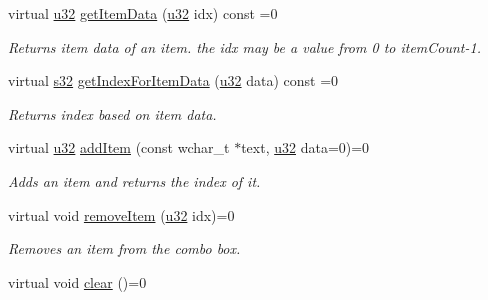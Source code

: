 \begin{DoxyCompactItemize}
virtual \hyperlink{namespaceirr_a0416a53257075833e7002efd0a18e804}{u32} \hyperlink{classirr_1_1gui_1_1IGUIComboBox_ac0f2189cf87e4ffe38834edea01c75fb}{get\+Item\+Data} (\hyperlink{namespaceirr_a0416a53257075833e7002efd0a18e804}{u32} idx) const =0
\begin{DoxyCompactList}\small\item\em Returns item data of an item. the idx may be a value from 0 to item\+Count-\/1. \end{DoxyCompactList}\item 
\mbox{\label{classirr_1_1gui_1_1IGUIComboBox_a01c1dea5455f7a9302cea8d156787c3e}} 
virtual \hyperlink{namespaceirr_ac66849b7a6ed16e30ebede579f9b47c6}{s32} \hyperlink{classirr_1_1gui_1_1IGUIComboBox_a01c1dea5455f7a9302cea8d156787c3e}{get\+Index\+For\+Item\+Data} (\hyperlink{namespaceirr_a0416a53257075833e7002efd0a18e804}{u32} data) const =0
\begin{DoxyCompactList}\small\item\em Returns index based on item data. \end{DoxyCompactList}\item 
\mbox{\label{classirr_1_1gui_1_1IGUIComboBox_a1952afb705f497306cb006c502ac181c}} 
virtual \hyperlink{namespaceirr_a0416a53257075833e7002efd0a18e804}{u32} \hyperlink{classirr_1_1gui_1_1IGUIComboBox_a1952afb705f497306cb006c502ac181c}{add\+Item} (const wchar\+\_\+t $\ast$text, \hyperlink{namespaceirr_a0416a53257075833e7002efd0a18e804}{u32} data=0)=0
\begin{DoxyCompactList}\small\item\em Adds an item and returns the index of it. \end{DoxyCompactList}\item 
virtual void \hyperlink{classirr_1_1gui_1_1IGUIComboBox_aa6a351f80aa57374459a9d66f416ce3c}{remove\+Item} (\hyperlink{namespaceirr_a0416a53257075833e7002efd0a18e804}{u32} idx)=0
\begin{DoxyCompactList}\small\item\em Removes an item from the combo box. \end{DoxyCompactList}\item 
\mbox{\label{classirr_1_1gui_1_1IGUIComboBox_af9f5d813496af19af437a6f51fa7e029}} 
virtual void \hyperlink{classirr_1_1gui_1_1IGUIComboBox_af9f5d813496af19af437a6f51fa7e029}{clear} ()=0

\end{DoxyCompactItemize}
